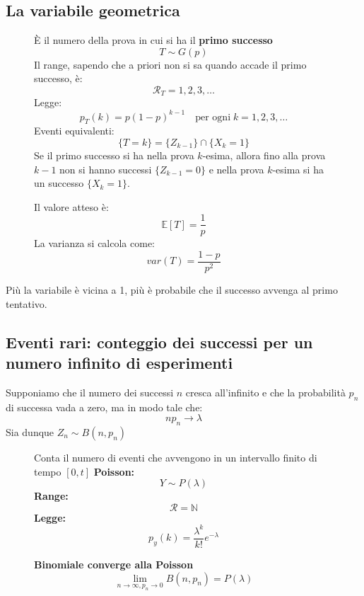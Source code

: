 \documentclass[a4paper]{article}
\theoremstyle{break}
\theoremstyle{break}
\theoremstyle{break}
\theoremstyle{break}
\begin{document}
\subsection{La variabile geometrica}
\begin{figure}[H]
  \begin{definition}
    È il numero della prova in cui si ha il \textbf{primo successo}
    \[
      T \sim G(p)
    \] 
    Il range, sapendo che a priori non si sa quando accade il primo successo, è:
    \[
      \mathcal{R}_T = 1,2,3, \ldots
    \] 
    Legge:
    \[
      p_T(k) = p(1-p)^{k-1} \quad \text{per ogni} \; k = 1,2,3, \ldots
    \] 
    Eventi equivalenti:
    \[
      \{T = k\} = \{Z_{k-1}\} \cap \{X_k = 1\}
    \] 
    Se il primo successo si ha nella prova \( k \)-esima, allora fino alla prova
    \( k - 1 \)  non si hanno successi \( \{Z_{k-1} = 0\} \)  e nella prova 
    \(  k \)-esima si ha un successo \( \{X_k = 1\} \).


    \vspace{1em}
    \noindent Il valore atteso è:
    \[
      \mathbb{E}[T] = \frac{1}{p}
    \] 
    La varianza si calcola come:
    \[
    var(T) = \frac{1-p}{p^2}
    \] 
  \end{definition}
\end{figure}
Più la variabile è vicina a 1, più è probabile che il successo avvenga al primo tentativo.

\subsection{Eventi rari: conteggio dei successi per un numero infinito di esperimenti}
Supponiamo che il numero dei successi \( n \) cresca all'infinito e che la probabilità
\( p_n \) di successa vada a zero, ma in modo tale che:
\[
np_n \to \lambda
\] 
Sia dunque \( Z_n \sim B(n,p_n) \) 

\begin{figure}[H]
  \begin{definition}[Poisson]
    Conta il numero di eventi che avvengono in un intervallo finito di tempo \( [0,t] \) 
    \textbf{Poisson:}
    \[
    Y \sim P(\lambda)
    \] 
    \textbf{Range:}
    \[
      \mathcal{R} = \mathbb{N}
    \] 
    \textbf{Legge:}
    \[
      p_y(k) = \frac{\lambda^k}{k!}e^{-\lambda}
    \] 
  \end{definition}
\end{figure}

\begin{figure}[H]
  \begin{definition}
    \textbf{Binomiale converge alla Poisson}
    \[
    \lim_{n \to \infty, p_n \to 0} B(n,p_n) = P(\lambda)
    \] 
  \end{definition}
\end{figure}
\end{document}
